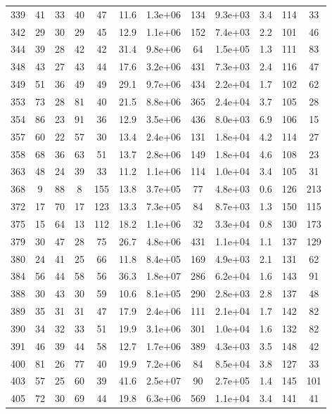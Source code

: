 \begin{table}
\begin{tabular}{cccccccccccc}
339 & 41 & 33 & 40 & 47 & 11.6 & 1.3e+06 & 134 & 9.3e+03 & 3.4 & 114 & 33 \\
342 & 29 & 30 & 29 & 45 & 12.9 & 1.1e+06 & 152 & 7.4e+03 & 2.2 & 101 & 46 \\
344 & 39 & 28 & 42 & 42 & 31.4 & 9.8e+06 & 64 & 1.5e+05 & 1.3 & 111 & 83 \\
348 & 43 & 27 & 43 & 44 & 17.6 & 3.2e+06 & 431 & 7.3e+03 & 2.4 & 116 & 47 \\
349 & 51 & 36 & 49 & 49 & 29.1 & 9.7e+06 & 434 & 2.2e+04 & 1.7 & 102 & 62 \\
353 & 73 & 28 & 81 & 40 & 21.5 & 8.8e+06 & 365 & 2.4e+04 & 3.7 & 105 & 28 \\
354 & 86 & 23 & 91 & 36 & 12.9 & 3.5e+06 & 436 & 8.0e+03 & 6.9 & 106 & 15 \\
357 & 60 & 22 & 57 & 30 & 13.4 & 2.4e+06 & 131 & 1.8e+04 & 4.2 & 114 & 27 \\
358 & 68 & 36 & 63 & 51 & 13.7 & 2.8e+06 & 149 & 1.8e+04 & 4.6 & 108 & 23 \\
363 & 48 & 24 & 39 & 33 & 11.2 & 1.1e+06 & 114 & 1.0e+04 & 3.4 & 105 & 31 \\
368 & 9 & 88 & 8 & 155 & 13.8 & 3.7e+05 & 77 & 4.8e+03 & 0.6 & 126 & 213 \\
372 & 17 & 70 & 17 & 123 & 13.3 & 7.3e+05 & 84 & 8.7e+03 & 1.3 & 150 & 115 \\
375 & 15 & 64 & 13 & 112 & 18.2 & 1.1e+06 & 32 & 3.3e+04 & 0.8 & 130 & 173 \\
379 & 30 & 47 & 28 & 75 & 26.7 & 4.8e+06 & 431 & 1.1e+04 & 1.1 & 137 & 129 \\
380 & 24 & 41 & 25 & 66 & 11.8 & 8.4e+05 & 169 & 4.9e+03 & 2.1 & 131 & 62 \\
384 & 56 & 44 & 58 & 56 & 36.3 & 1.8e+07 & 286 & 6.2e+04 & 1.6 & 143 & 91 \\
388 & 30 & 43 & 30 & 59 & 10.6 & 8.1e+05 & 290 & 2.8e+03 & 2.8 & 137 & 48 \\
389 & 35 & 31 & 31 & 47 & 17.9 & 2.4e+06 & 111 & 2.1e+04 & 1.7 & 142 & 82 \\
390 & 34 & 32 & 33 & 51 & 19.9 & 3.1e+06 & 301 & 1.0e+04 & 1.6 & 132 & 82 \\
391 & 46 & 39 & 44 & 58 & 12.7 & 1.7e+06 & 389 & 4.3e+03 & 3.5 & 148 & 42 \\
400 & 81 & 26 & 77 & 40 & 19.9 & 7.2e+06 & 84 & 8.5e+04 & 3.8 & 127 & 33 \\
403 & 57 & 25 & 60 & 39 & 41.6 & 2.5e+07 & 90 & 2.7e+05 & 1.4 & 145 & 101 \\
405 & 72 & 30 & 69 & 44 & 19.8 & 6.3e+06 & 569 & 1.1e+04 & 3.4 & 141 & 41 \\

\end{tabular}
\end{table}
